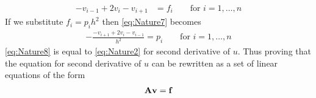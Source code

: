 \begin{align}
	-v_{i-1} + 2v_i -v_{i+1} &= f_i \qquad \text{for } i = 1,\dots , n
	\label{eq:Nature7}
\end{align}
If we substitute $f_i = p_i h^2$ then \eqref{eq:Nature7} becomes
\begin{align}
	-\frac{-v_{i+1}+2v_i-v_{i-1}}{h^2} = p_i  \qquad \text{for } i=1,\dots, n
	\label{eq:Nature8}
\end{align}
\eqref{eq:Nature8} is equal to \eqref{eq:Nature2} for second derivative of $u$. 
Thus proving that the equation for second derivative of $u$ can be rewritten as a set of linear equations of the form
\begin{align}
	\mbox{\textbf{A}} \mbox{\textbf{v}} = \mbox{\textbf{f}}
	\label{eq:Nature9}
\end{align}
